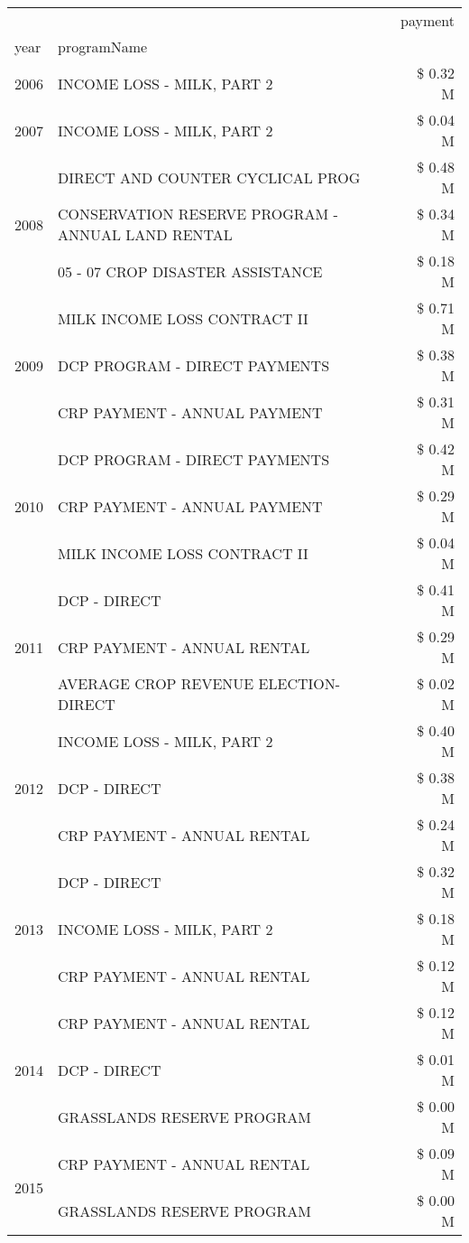 \begin{tabular}{llr}
\toprule
 &  & payment \\
year & programName &  \\
\midrule
2006 & INCOME LOSS - MILK, PART 2 & \$ 0.32 M \\
\cline{1-3}
2007 & INCOME LOSS - MILK, PART 2 & \$ 0.04 M \\
\cline{1-3}
\multirow[t]{3}{*}{2008} & DIRECT AND COUNTER CYCLICAL PROG & \$ 0.48 M \\
 & CONSERVATION RESERVE PROGRAM - ANNUAL LAND RENTAL & \$ 0.34 M \\
 & 05 - 07 CROP DISASTER ASSISTANCE & \$ 0.18 M \\
\cline{1-3}
\multirow[t]{3}{*}{2009} & MILK INCOME LOSS CONTRACT II & \$ 0.71 M \\
 & DCP PROGRAM - DIRECT PAYMENTS & \$ 0.38 M \\
 & CRP PAYMENT - ANNUAL PAYMENT & \$ 0.31 M \\
\cline{1-3}
\multirow[t]{3}{*}{2010} & DCP PROGRAM - DIRECT PAYMENTS & \$ 0.42 M \\
 & CRP PAYMENT - ANNUAL PAYMENT & \$ 0.29 M \\
 & MILK INCOME LOSS CONTRACT II & \$ 0.04 M \\
\cline{1-3}
\multirow[t]{3}{*}{2011} & DCP - DIRECT & \$ 0.41 M \\
 & CRP PAYMENT - ANNUAL RENTAL & \$ 0.29 M \\
 & AVERAGE CROP REVENUE ELECTION-DIRECT & \$ 0.02 M \\
\cline{1-3}
\multirow[t]{3}{*}{2012} & INCOME LOSS - MILK, PART 2 & \$ 0.40 M \\
 & DCP - DIRECT & \$ 0.38 M \\
 & CRP PAYMENT - ANNUAL RENTAL & \$ 0.24 M \\
\cline{1-3}
\multirow[t]{3}{*}{2013} & DCP - DIRECT & \$ 0.32 M \\
 & INCOME LOSS - MILK, PART 2 & \$ 0.18 M \\
 & CRP PAYMENT - ANNUAL RENTAL & \$ 0.12 M \\
\cline{1-3}
\multirow[t]{3}{*}{2014} & CRP PAYMENT - ANNUAL RENTAL & \$ 0.12 M \\
 & DCP - DIRECT & \$ 0.01 M \\
 & GRASSLANDS RESERVE PROGRAM & \$ 0.00 M \\
\cline{1-3}
\multirow[t]{3}{*}{2015} & CRP PAYMENT - ANNUAL RENTAL & \$ 0.09 M \\
 & GRASSLANDS RESERVE PROGRAM & \$ 0.00 M \\

\end{tabular}
